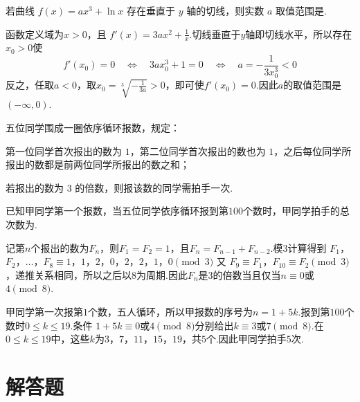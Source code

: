 \begin{problem}
若曲线 \( f(x) = ax^3 + \ln x \) 存在垂直于 \( y \) 轴的切线，则实数 \( a \) 取值范围是\fillinblank{}.

\begin{solution}
函数定义域为\(x>0\)，且
\(f'(x)=3ax^2+\frac{1}{x}\).切线垂直于\(y\)轴即切线水平，所以存在\(x_0>0\)使
\[
f'(x_0)=0
\quad\Longleftrightarrow\quad
3ax_0^3+1=0
\quad\Longleftrightarrow\quad
a=-\frac{1}{3x_0^3}<0
\]
反之，任取\(a<0\)，取\(x_0=\sqrt[3]{-\frac{1}{3a}}>0\)，即可使\(f'(x_0)=0\).因此\(a\)的取值范围是\((-\infty,0)\).
\end{solution}
\end{problem}

\begin{problem}
五位同学围成一圈依序循环报数，规定：

\begin{circlelist}
\item 第一位同学首次报出的数为 \(1\)，第二位同学首次报出的数也为 \(1\)，之后每位同学所报出的数都是前两位同学所报出的数之和；
\item 若报出的数为 \(3\) 的倍数，则报该数的同学需拍手一次.
\end{circlelist}

已知甲同学第一个报数，当五位同学依序循环报到第\(100\)个数时，甲同学拍手的总次数为\fillinblank{}.

\begin{solution}
记第\(n\)个报出的数为\(F_n\)，则\(F_1=F_2=1\)，且\(F_n=F_{n-1}+F_{n-2}\).模\(3\)计算得到
\(F_1\)，\(F_2\)，\(\ldots\)，\(F_8\equiv1\)，\(1\)，\(2\)，\(0\)，\(2\)，\(2\)，\(1\)，\(0\pmod{3}\)
又 \(F_9\equiv F_1\)，\(F_{10}\equiv F_2\pmod{3}\)，递推关系相同，所以之后以\(8\)为周期.因此\(F_n\)是\(3\)的倍数当且仅当\(n\equiv0\)或\(4\pmod{8}\).

甲同学第一次报第\(1\)个数，五人循环，所以甲报数的序号为\(n=1+5k\).报到第\(100\)个数时\(0\leqslant k\leqslant19\).条件
\(1+5k\equiv0\)或\(4\pmod{8}\)分别给出\(k\equiv3\)或\(7\pmod{8}\).在\(0\leqslant k\leqslant19\)中，这些\(k\)为\(3\)，\(7\)，\(11\)，\(15\)，\(19\)，共\(5\)个.因此甲同学拍手\(5\)次.
\end{solution}
\end{problem}

\section{解答题}

